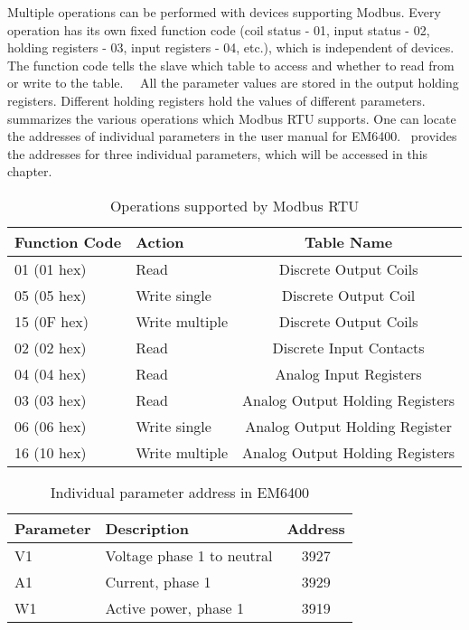Multiple operations can be performed with devices supporting Modbus. 
Every operation has its own fixed function code (coil status - 01, 
input status - 02, holding registers - 03, input registers - 04, etc.), 
which is independent of devices. The function code tells the slave which 
table to access and whether to read from or write to the table.  
All the parameter values are stored in the output holding registers. 
Different holding registers hold the values of different parameters. 
 summarizes the various operations which 
Modbus RTU supports. One can locate the addresses of individual parameters  
in the user manual for EM6400.  provides the addresses
for three individual parameters, which will be accessed in this chapter.  


\begin{table}
  \centering
  \caption{Operations supported by Modbus RTU}
  \label{tab:modbus-fun-codes}
  \begin{tabular}{llc}\hline
    Function Code & Action         & Table Name                      \\  \hline 
    01 (01 hex)   & Read           & Discrete Output Coils           \\ 
    05 (05 hex)   & Write single   & Discrete Output Coil            \\ 
    15 (0F hex)   & Write multiple & Discrete Output Coils           \\ 
    02 (02 hex)   & Read           & Discrete Input Contacts         \\ 
    04 (04 hex)   & Read           & Analog Input Registers          \\ 
    03 (03 hex)   & Read           & Analog Output Holding Registers \\ 
    06 (06 hex)   & Write single   & Analog Output Holding Register  \\ 
    16 (10 hex)   & Write multiple & Analog Output Holding Registers \\
    \hline 
  \end{tabular}
\end{table}


\begin{table}
  \centering
  \caption{Individual parameter address in EM6400}
  \label{tab:params-addr}
  \begin{tabular}{llc}\hline
    Parameter & Description                & Address \\  \hline 
    V1        & Voltage phase 1 to neutral & 3927    \\ 
    A1        & Current, phase 1           & 3929    \\ 
    W1        & Active power, phase 1      & 3919    \\
    \hline 
  \end{tabular}
\end{table}


